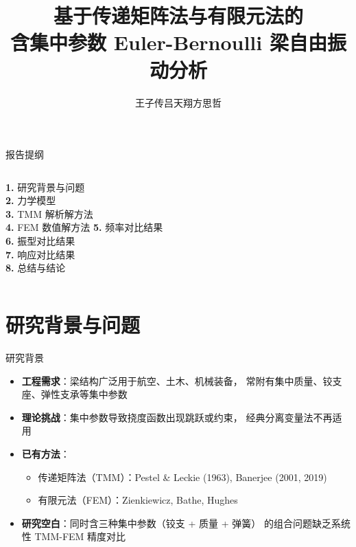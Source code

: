\documentclass[12pt,aspectratio=169]{ctexbeamer}
\title[含集中参数梁的 TMM-FEM 对比]{\textbf{基于传递矩阵法与有限元法的\\含集中参数 Euler-Bernoulli 梁自由振动分析}}
\author[王子传, 吕天翔, 方思哲]{王子传\quad 吕天翔\quad 方思哲}
\institute[天津大学]{天津大学\quad 机械工程学院}
\date{}
\begin{document}
\begin{frame}
  \maketitle
\end{frame}

\begin{frame}{报告提纲}
  \begin{columns}[T]
      \textbf{\large 1.} \quad 研究背景与问题 \\
      \textbf{\large 2.} \quad 力学模型 \\
      \textbf{\large 3.} \quad TMM 解析解方法 \\
      \textbf{\large 4.} \quad FEM 数值解方法
      \textbf{\large 5.} \quad 频率对比结果 \\
      \textbf{\large 6.} \quad 振型对比结果 \\
      \textbf{\large 7.} \quad 响应对比结果 \\
      \textbf{\large 8.} \quad 总结与结论
  \end{columns}
\end{frame}

\section{研究背景与问题}

\begin{frame}{研究背景}
  \begin{itemize}
    \item \textbf{工程需求}：梁结构广泛用于航空、土木、机械装备，
          常附有集中质量、铰支座、弹性支承等集中参数
    \item \textbf{理论挑战}：集中参数导致挠度函数出现跳跃或约束，
          经典分离变量法不再适用
    \item \textbf{已有方法}：
      \begin{itemize}
        \item 传递矩阵法（TMM）：Pestel \& Leckie (1963), Banerjee (2001, 2019)
        \item 有限元法（FEM）：Zienkiewicz, Bathe, Hughes
      \end{itemize}
    \item \textbf{研究空白}：同时含三种集中参数（铰支 + 质量 + 弹簧）
          的组合问题缺乏系统性 TMM-FEM 精度对比
  \end{itemize}
\end{frame}
\end{document}
